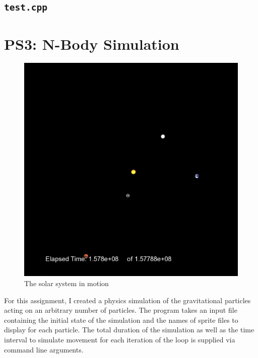 \documentclass[12pt]{article}
\begin{document}
\subsection{\texttt{test.cpp}}
\label{section:LFSR_test}



\newpage

\section{PS3: N-Body Simulation}

\begin{figure}

\includegraphics[scale=0.3]{../ps3b/screenshot.png}
\centering
\caption{The solar system in motion}
\label{fig:solar_system}
\end{figure}

For this assignment, I created a physics simulation of the gravitational particles acting on an arbitrary number of particles. The program takes an input file containing the initial state of the simulation and the names of sprite files to display for each particle. The total duration of the simulation as well as the time interval to simulate movement for each iteration of the loop is supplied via command line arguments.
\end{document}
